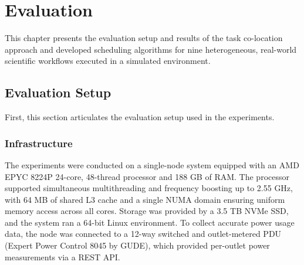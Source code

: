 \section{Evaluation}
\label{cha:evaluation}
This chapter presents the evaluation setup and results of the task co-location approach and developed scheduling algorithms for nine heterogeneous, real-world scientific workflows executed in a simulated environment.
\subsection{Evaluation Setup}
\label{sec:evaluation_setup}
First, this section articulates the evaluation setup used in the experiments.

\subsubsection{Infrastructure}
\label{sec:evaluation_infrastructure}
The experiments were conducted on a single-node system equipped with an AMD EPYC 8224P 24-core, 48-thread processor and 188 GB of RAM. The processor supported simultaneous multithreading and frequency boosting up to 2.55 GHz, with 64 MB of shared L3 cache and a single NUMA domain ensuring uniform memory access across all cores. Storage was provided by a 3.5 TB NVMe SSD, and the system ran a 64-bit Linux environment.
To collect accurate power usage data, the node was connected to a 12-way switched and outlet-metered PDU (Expert Power Control 8045 by GUDE), which provided per-outlet power measurements via a REST API.

